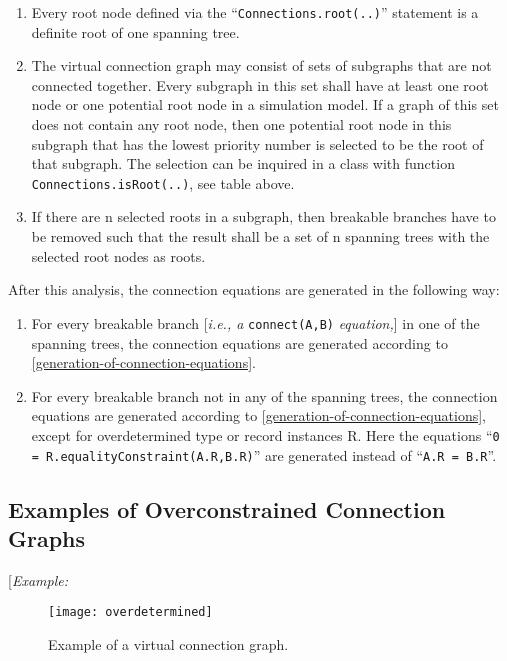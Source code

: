 \begin{enumerate}
\item
  Every root node defined via the ``\lstinline!Connections.root(..)!'' statement is
  a definite root of one spanning tree.
\item
  The virtual connection graph may consist of sets of subgraphs that are
  not connected together. Every subgraph in this set shall have at least
  one root node or one potential root node in a simulation model. If a
  graph of this set does not contain any root node, then one potential
  root node in this subgraph that has the lowest priority number is
  selected to be the root of that subgraph. The selection can be
  inquired in a class with function \lstinline!Connections.isRoot(..)!, see table
  above.
\item
  If there are n selected roots in a subgraph, then breakable branches
  have to be removed such that the result shall be a set of n spanning
  trees with the selected root nodes as roots.
\end{enumerate}

After this analysis, the connection equations are generated in the
following way:

\begin{enumerate}
\item
  For every breakable branch {[}\emph{i.e., a} \lstinline!connect(A,B)!
  \emph{equation,}{]} in one of the spanning trees, the connection
  equations are generated according to \autoref{generation-of-connection-equations}.
\item
  For every breakable branch not in any of the spanning trees, the
  connection equations are generated according to \autoref{generation-of-connection-equations}, except
  for overdetermined type or record instances R. Here the equations
  ``\lstinline!0 = R.equalityConstraint(A.R,B.R)!'' are generated instead
  of ``\lstinline!A.R = B.R!''.
\end{enumerate}

\subsection{Examples of Overconstrained Connection Graphs}

{[}\emph{Example:}

\begin{figure}[H]
\caption{Example of a virtual connection graph.}
\texttt{[image: overdetermined]}
\end{figure}

